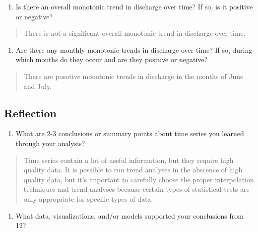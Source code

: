 \documentclass[]{article}
\providecommand{\tightlist}{%
  \setlength{\itemsep}{0pt}\setlength{\parskip}{0pt}}
\begin{document}
\begin{enumerate}
\def\labelenumi{\arabic{enumi}.}
\setcounter{enumi}{12}
\tightlist
\item
  Is there an overall monotonic trend in discharge over time? If so, is
  it positive or negative?
\end{enumerate}

\begin{quote}
There is not a significant overall monotonic trend in discharge over
time.
\end{quote}

\begin{enumerate}
\def\labelenumi{\arabic{enumi}.}
\setcounter{enumi}{13}
\tightlist
\item
  Are there any monthly monotonic trends in discharge over time? If so,
  during which months do they occur and are they positive or negative?
\end{enumerate}

\begin{quote}
There are posotive monotonic trends in discharge in the months of June
and July.
\end{quote}

\hypertarget{reflection}{%
\subsection{Reflection}\label{reflection}}

\begin{enumerate}
\def\labelenumi{\arabic{enumi}.}
\setcounter{enumi}{14}
\tightlist
\item
  What are 2-3 conclusions or summary points about time series you
  learned through your analysis?
\end{enumerate}

\begin{quote}
Time series contain a lot of useful information, but they require high
quality data. It is possible to run trend analyses in the abscence of
high quality data, but it's important to carefully choose the proper
interpolation techniques and trend analyses because certain types of
statistical tests are only appropriate for specific types of data.
\end{quote}

\begin{enumerate}
\def\labelenumi{\arabic{enumi}.}
\setcounter{enumi}{15}
\tightlist
\item
  What data, visualizations, and/or models supported your conclusions
  from 12?
\end{enumerate}
\end{document}
